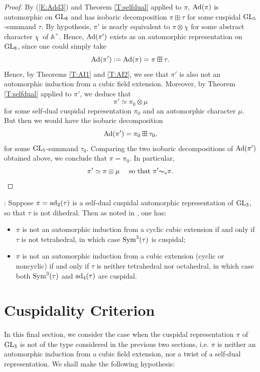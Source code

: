 \documentclass[11pt]{amsart}
\theoremstyle{plain}
\numberwithin{equation}{section}
\newcommand{\A}{\mathbb A}
\def\GL{{\rm GL}}
\def\A{{\mathbb A}}
\begin{document}
\begin{proof}
By (\ref{E:Add3}) and Theorem \ref{T:selfdual} applied to $\pi$, ${\rm Ad}(\pi)$ is automorphic on $\GL_8$ and has isobaric decomposition $\pi \boxplus \tau$ for some cuspidal $\GL_5$-summand $\tau$. By hypothesis, $\pi'$ is nearly equivalent to $\pi \otimes \chi$ for some abstract character $\chi$\ of $\A^{\times}$.
Hence,  ${\rm Ad}(\pi')$ exists as an automorphic representation on $\GL_8$, since one could simply take 
\[ {\rm Ad}(\pi') := {\rm Ad}(\pi) = \pi \boxplus  \tau. \]
Hence, by Theorems \ref{T:AI1} and \ref{T:AI2}, we see that $\pi'$ is also not an automorphic induction from a cubic field extension.  Moreover,
 by Theorem \ref{T:selfdual} applied to $\pi'$, we deduce that 
 \[  \pi' \simeq \pi_0 \otimes \mu \]
 for some self-dual cuspidal representation $\pi_0$ and an automorphic character $\mu$.  But then we would have the isobaric decomposition
 \[  {\rm Ad}(\pi')  = \pi_0 \boxplus \tau_0, \]
 for some $\GL_5$-summand $\tau_0$.  Comparing the two isobaric decompositions of ${\rm Ad}(\pi')$ obtained above, we conclude that $\pi   =\pi_0$.  In particular, 
 \[  \pi' \simeq  \pi \otimes \mu \quad \text{ so that $\pi' {\thicksim}_s \pi$.} \]
\end{proof} 

\vskip 10pt

: Suppose $\pi = {\rm ad}_2(\tau)$ is a self-dual cuspidal automorphic representation of $\GL_3$, so that $\tau$ is not dihedral. Then as noted in \cite[Thm. 3.3.7]{KS2}, one has:
\vskip 5pt

\begin{itemize}
\item $\pi$ is not an automorphic induction from a cyclic cubic extension if and only if $\tau$ is not tetrahedral, in which case ${\rm Sym}^3(\tau)$ is cuspidal;
\vskip 5pt

\item $\pi$ is not an automorphic induction from a cubic extension (cyclic or noncyclic) if and only if $\tau$ is neither tetrahedral nor octahedral, in which case both ${\rm Sym}^3(\tau)$ and 
${\rm ad}_4(\tau)$ are cuspidal.
\end{itemize}

\vskip 10pt


\section{\bf Cuspidality Criterion}
In this final section, we consider the case when the cuspidal representation $\pi$ of $\GL_3$ is not of the type considered in the previous two sections, i.e. $\pi$ is neither an automorphic induction from a cubic field extension, nor a twist of a self-dual representation. 
We shall make the following hypothesis:
\vskip 5pt
\end{document}
